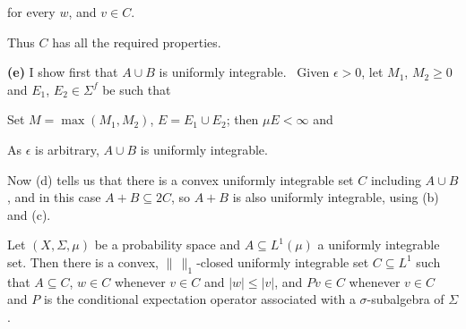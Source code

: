 {\noindent for every $w$, and $v\in C$.

Thus $C$ has all the required properties.

\medskip

{\bf (e)} I show first that $A\cup B$ is uniformly integrable.
\Prf\ Given $\epsilon>0$, let $M_1$, $M_2\ge 0$ and $E_1$,
$E_2\in\Sigma^f$ be such that



\noindent Set $M=\max(M_1,M_2)$, $E=E_1\cup E_2$;  then $\mu E<\infty$ and


\noindent As $\epsilon$ is arbitrary, $A\cup B$ is uniformly integrable.
\Qed

Now (d) tells us that there is a convex uniformly integrable set $C$
including $A\cup B$, and in this case $A+B\subseteq 2C$, so $A+B$ is
also uniformly integrable, using (b) and (c).
}%

 Let $(X,\Sigma,\mu)$ be a probability space
and $A\subseteq L^1(\mu)$ a uniformly integrable set.   Then there is a
convex, $\|\,\|_1$-closed uniformly integrable set $C\subseteq L^1$ such
that $A\subseteq C$, $w\in C$ whenever $v\in C$ and $|w|\le|v|$, and
$Pv\in C$ whenever $v\in C$ and $P$ is the conditional expectation
operator associated with a $\sigma$-subalgebra of $\Sigma$.


